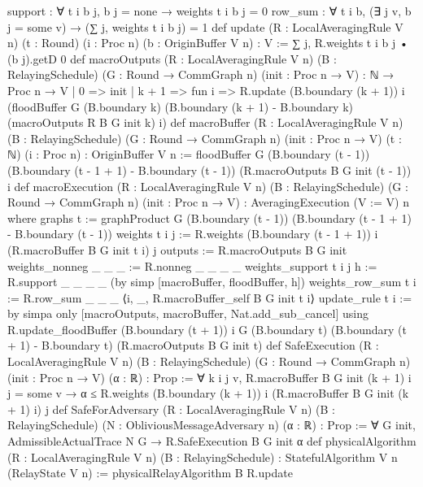 \begin{leanlisting}
\begin{leancode}
  support : ∀ t i b j, b j = none → weights t i b j = 0
  row_sum : ∀ t i b, (∃ j v, b j = some v) → (∑ j, weights t i b j) = 1
def update (R : LocalAveragingRule V n) (t : Round) (i : Proc n)
    (b : OriginBuffer V n) : V := ∑ j, R.weights t i b j • (b j).getD 0
def macroOutputs (R : LocalAveragingRule V n) (B : RelayingSchedule)
    (G : Round → CommGraph n) (init : Proc n → V) : ℕ → Proc n → V
  | 0 => init
  | k + 1 => fun i => R.update (B.boundary (k + 1)) i
      (floodBuffer G (B.boundary k) (B.boundary (k + 1) - B.boundary k)
        (macroOutputs R B G init k) i)
def macroBuffer (R : LocalAveragingRule V n) (B : RelayingSchedule)
    (G : Round → CommGraph n) (init : Proc n → V) (t : ℕ) (i : Proc n) : OriginBuffer V n :=
  floodBuffer G (B.boundary (t - 1)) (B.boundary (t - 1 + 1) - B.boundary (t - 1))
    (R.macroOutputs B G init (t - 1)) i
def macroExecution (R : LocalAveragingRule V n) (B : RelayingSchedule)
    (G : Round → CommGraph n) (init : Proc n → V) : AveragingExecution (V := V) n where
  graphs t := graphProduct G (B.boundary (t - 1))
    (B.boundary (t - 1 + 1) - B.boundary (t - 1))
  weights t i j := R.weights (B.boundary (t - 1 + 1)) i (R.macroBuffer B G init t i) j
  outputs := R.macroOutputs B G init
  weights_nonneg _ _ _ := R.nonneg _ _ _ _
  weights_support t i j h := R.support _ _ _ _ (by simp [macroBuffer, floodBuffer, h])
  weights_row_sum t i := R.row_sum _ _ _ ⟨i, _, R.macroBuffer_self B G init t i⟩
  update_rule t i := by
    simpa only [macroOutputs, macroBuffer, Nat.add_sub_cancel] using
      R.update_floodBuffer (B.boundary (t + 1)) i G (B.boundary t)
        (B.boundary (t + 1) - B.boundary t) (R.macroOutputs B G init t)
def SafeExecution (R : LocalAveragingRule V n) (B : RelayingSchedule)
    (G : Round → CommGraph n) (init : Proc n → V) (α : ℝ) : Prop :=
  ∀ k i j v, R.macroBuffer B G init (k + 1) i j = some v →
    α ≤ R.weights (B.boundary (k + 1)) i (R.macroBuffer B G init (k + 1) i) j
def SafeForAdversary (R : LocalAveragingRule V n) (B : RelayingSchedule)
    (N : ObliviousMessageAdversary n) (α : ℝ) : Prop :=
  ∀ G init, AdmissibleActualTrace N G → R.SafeExecution B G init α
def physicalAlgorithm (R : LocalAveragingRule V n) (B : RelayingSchedule) :
    StatefulAlgorithm V n (RelayState V n) := physicalRelayAlgorithm B R.update
\end{leancode}
\end{leanlisting}

